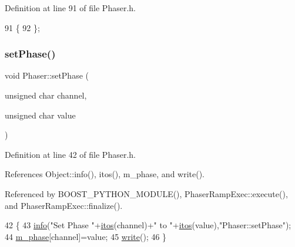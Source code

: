 Definition at line 91 of file Phaser.\+h.


\begin{DoxyCode}
91                \{
92   \};
\end{DoxyCode}
\mbox{\label{classPhaser_a35c0add55885b3c0a7551ff48e322632}} 
\subsubsection{\texorpdfstring{set\+Phase()}{setPhase()}\hspace{0.1cm}{\footnotesize\ttfamily [1/2]}}
{\footnotesize\ttfamily void Phaser\+::set\+Phase (\begin{DoxyParamCaption}\item[{unsigned char}]{channel,  }\item[{unsigned char}]{value }\end{DoxyParamCaption})\hspace{0.3cm}{\ttfamily [inline]}}



Definition at line 42 of file Phaser.\+h.



References Object\+::info(), itos(), m\+\_\+phase, and write().



Referenced by B\+O\+O\+S\+T\+\_\+\+P\+Y\+T\+H\+O\+N\+\_\+\+M\+O\+D\+U\+L\+E(), Phaser\+Ramp\+Exec\+::execute(), and Phaser\+Ramp\+Exec\+::finalize().


\begin{DoxyCode}
42                                                            \{
43     \hyperlink{classObject_a644fd329ea4cb85f54fa6846484b84a8}{info}(\textcolor{stringliteral}{"Set Phase "}+\hyperlink{Tools_8h_af330027dbdafb9a30768b3613c553e60}{itos}(channel)+\textcolor{stringliteral}{" to "}+\hyperlink{Tools_8h_af330027dbdafb9a30768b3613c553e60}{itos}(value),\textcolor{stringliteral}{"Phaser::setPhase"});
44     \hyperlink{classPhaser_a04df9ce4afe7a36ccaba5e5e727d504e}{m\_phase}[channel]=value;
45     \hyperlink{classPhaser_a7a94d4129a5f743c482fa97f3c5df68f}{write}();
46   \}
\end{DoxyCode}
\mbox{\label{classPhaser_a658be408ea31d55067e283723fa144f1}} 
